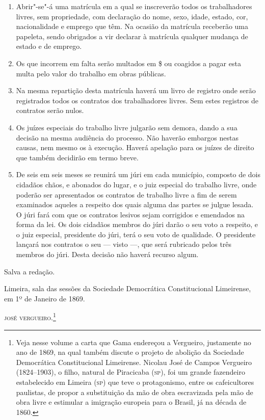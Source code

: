 \begin{enumerate}[label=Art. \arabic*º]
\begin{enumerate}[label=§ \arabic*º]
\item Abrir"-se"-á uma matrícula em a qual se inscreverão todos os
trabalhadores livres, sem propriedade, com declaração do nome, sexo,
idade, estado, cor, nacionalidade e emprego que têm. Na ocasião da
matrícula receberão uma papeleta, sendo obrigados a vir declarar à
matrícula qualquer mudança de estado e de emprego.

\item Os que incorrem em falta serão multados em \$ ou coagidos a pagar
esta multa pelo valor do trabalho em obras públicas.

\item Na mesma repartição desta matrícula haverá um livro de registro
onde serão registrados todos os contratos dos trabalhadores livres. Sem
estes registros de contratos serão nulos.

\item Os juízes especiais do trabalho livre julgarão sem demora, dando a
sua decisão na mesma audiência do processo. Não haverão embargos nestas
causas, nem mesmo os à execução. Haverá apelação para os juízes de
direito que também decidirão em termo breve.

\item De seis em seis meses se reunirá um júri em cada município,
composto de dois cidadãos chãos, e abonados do lugar, e o juiz especial
do trabalho livre, onde poderão ser apresentados os contratos de
trabalho livre a fim de serem examinados aqueles a respeito dos quais
alguma das partes se julgue lesada. O júri fará com que os contratos
lesivos sejam corrigidos e emendados na forma da lei. Os dois cidadãos
membros do júri darão o seu voto a respeito, e o juiz especial,
presidente do júri, terá o seu voto de qualidade. O presidente lançará
nos contratos o seu --- visto ---, que será rubricado pelos três
membros do júri. Desta decisão não haverá recurso algum.
\end{enumerate}
\end{enumerate}

Salva a redação.

Limeira, sala das sessões da Sociedade Democrática Constitucional
Limeirense, em 1º de Janeiro de 1869.

\hfill\textsc{josé vergueiro}.\footnote{Veja nesse volume a carta que Gama endereçou a
  Vergueiro, justamente no ano de 1869, na qual também discute o
  projeto de abolição da Sociedade Democrática Constitucional
  Limeirense. Nicolau José de Campos Vergueiro (1824--1903), o filho,
  natural de Piracicaba (\textsc{sp}), foi um grande fazendeiro estabelecido em
  Limeira (\textsc{sp}) que teve o protagonismo, entre os cafeicultores
  paulistas, de propor a substituição da mão de obra escravizada pela
  mão de obra livre e estimular a imigração europeia para o Brasil, já
  na década de 1860.}\bigskip

